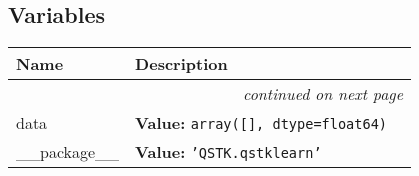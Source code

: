 
  \subsection{Variables}

    \vspace{-1cm}
\hspace{\varindent}\begin{longtable}{|p{\varnamewidth}|p{\vardescrwidth}|l}
\cline{1-2}
\cline{1-2} \centering \textbf{Name} & \centering \textbf{Description}& \\
\cline{1-2}
\endhead\cline{1-2}\multicolumn{3}{r}{\small\textit{continued on next page}}\\\endfoot\cline{1-2}
\endlastfoot\raggedright d\-a\-t\-a\- & \raggedright \textbf{Value:} 
{\tt array([], dtype=float64)}&\\
\cline{1-2}
\raggedright \_\-\_\-p\-a\-c\-k\-a\-g\-e\-\_\-\_\- & \raggedright \textbf{Value:} 
{\tt \texttt{'}\texttt{QSTK.qstklearn}\texttt{'}}&\\
\cline{1-2}
\end{longtable}

